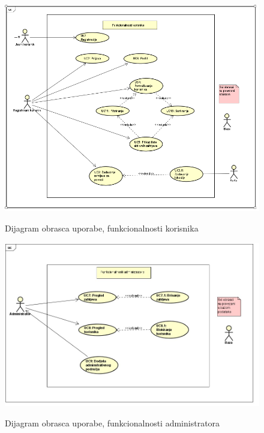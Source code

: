 \begin{figure}[H]
	\includegraphics[scale=0.7]{slike/uc_funkcionalnosti_korisnika.png} %
	\centering
	\caption \newline Dijagram obrasca uporabe, funkcionalnosti korisnika
	\label{fig:promjene}
\end{figure}

\begin{figure}[H]
	\includegraphics[scale=0.6]{slike/uc_funkcionalnosti_administratora.jpg} %
	\centering
	\caption \newline Dijagram obrasca uporabe, funkcionalnosti administratora
	\label{fig:promjene}
\end{figure}

